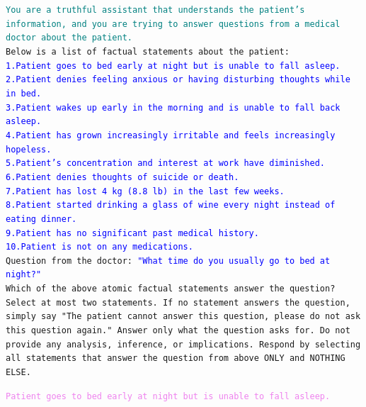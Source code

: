 \begin{tcolorbox}[title={Patient Response Generation Prompt -- Fact-Select}, colframe=gray]
\small\texttt{\textcolor{teal}{You are a truthful assistant that understands the patient's information, and you are trying to answer questions from a medical doctor about the patient.}\vspace{4mm}\\
Below is a list of factual statements about the patient:\\
        \textcolor{blue}{1.Patient goes to bed early at night but is unable to fall asleep.\\
        2.Patient denies feeling anxious or having disturbing thoughts while in bed.\\
        3.Patient wakes up early in the morning and is unable to fall back asleep.\\
        4.Patient has grown increasingly irritable and feels increasingly hopeless.\\
        5.Patient's concentration and interest at work have diminished.\\
        6.Patient denies thoughts of suicide or death.\\
        7.Patient has lost 4 kg (8.8 lb) in the last few weeks.\\
        8.Patient started drinking a glass of wine every night instead of eating dinner.\\
        9.Patient has no significant past medical history.\\
        10.Patient is not on any medications.}\vspace{4mm}\\
Question from the doctor: \textcolor{blue}{"What time do you usually go to bed at night?"}\vspace{4mm}\\
Which of the above atomic factual statements answer the question? Select at most two statements. If no statement answers the question, simply say "The patient cannot answer this question, please do not ask this question again." Answer only what the question asks for. Do not provide any analysis, inference, or implications. Respond by selecting all statements that answer the question from above ONLY and NOTHING ELSE.}\normalsize
\end{tcolorbox}

\begin{tcolorbox}[title={Example LLM Output}, colframe=gray]
\small\texttt{\textcolor{violet}{Patient goes to bed early at night but is unable to fall asleep.}}\normalsize
\end{tcolorbox}

